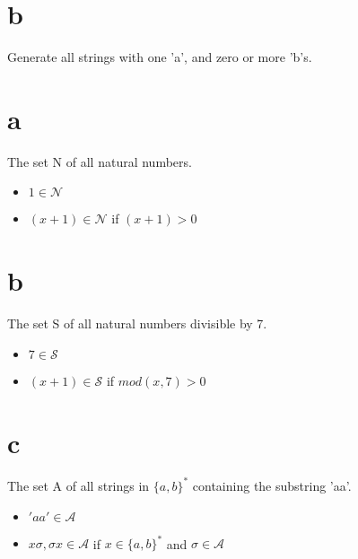 \part{b} Generate all strings with one 'a', and zero or more 'b's. 


\part{a} The set N of all natural numbers. 

\begin{center}
\begin{itemize}
  \item $1 \in {\mathcal{N}}$ \\
  \item $(x + 1) \in {\mathcal{N}}$ if $(x+1) > 0$
  \end{itemize}
\end{center}

\pagebreak

\part{b} The set S of all natural numbers divisible by 7. 

\begin{center}
\begin{itemize}
  \item $7 \in {\mathcal{S}}$ \\
  \item $(x + 1) \in {\mathcal{S}}$ if $mod(x,7) > 0$
  \end{itemize}
\end{center}

\part{c} The set A of all strings in $\{a, b\}^*$ containing the substring 'aa'. 

\begin{center}
\begin{itemize}
  \item $'aa' \in {\mathcal{A}}$ \\
  \item $x\sigma,{\sigma}x \in \mathcal{A}$ if $x \in \{a, b\}^*$ and $\sigma \in {\mathcal{A}}$
  \end{itemize}
\end{center}

